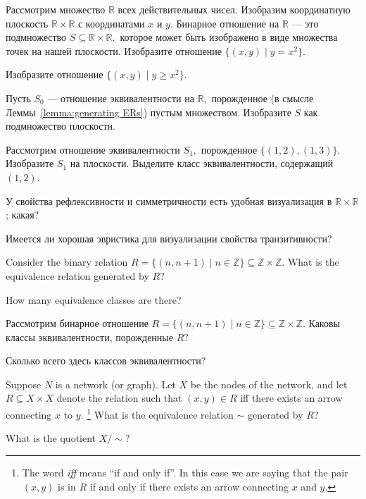 \documentclass[../main/CT4S-EN-RU]{subfiles}
\begin{document}
\begin{exerciseRUS}
Рассмотрим множество ${ℝ}$ всех действительных чисел. Изобразим координатную плоскость ${ℝ}\times{ℝ}$ с координатами $x$ и $y.$ Бинарное отношение на ${ℝ}$ — это подмножество $S\subseteq{ℝ}\times{ℝ},$ которое может быть изображено в виде множества точек на нашей плоскости. 
\sexc Изобразите отношение $\{(x,y){\;|\;}y=x^2\}.$ 
\item Изобразите отношение $\{(x,y){\;|\;}y\geq x^2\}.$
\item Пусть $S_0$ — отношение эквивалентности на ${ℝ},$ порожденное (в смысле Леммы~\ref{lemma:generating ERs}) пустым множеством. Изобразите $S$ как подмножество плоскости.
\item Рассмотрим отношение эквивалентности $S_1,$ порожденное $\{(1,2),(1,3)\}.$ Изобразите $S_1$ на плоскости. Выделите класс эквивалентности, содержащий $(1,2).$
\item У свойства рефлексивности и симметричности есть удобная визуализация в ${ℝ}\times{ℝ}$; какая? 
\item Имеется ли хорошая эвристика для визуализации свойства транзитивности?
\endsexc
\end{exerciseRUS}

\begin{exerciseENG}
Consider the binary relation $R=\{(n,n+1){\;|\;}n\in{ℤ}\}\subseteq{ℤ}\times{ℤ}.$ 
\sexc What is the equivalence relation generated by $R?$ 
\item How many equivalence classes are there?
\endsexc
\end{exerciseENG}

\begin{exerciseRUS}
Рассмотрим бинарное отношение $R=\{(n,n+1){\;|\;}n\in{ℤ}\}\subseteq{ℤ}\times{ℤ}.$ 
\sexc Каковы классы эквивалентности, порожденные $R?$ 
\item Сколько всего здесь классов эквивалентности?
\endsexc
\end{exerciseRUS}

\begin{exerciseENG}
Suppose $N$ is a network (or graph). Let $X$ be the nodes of the network, and let $R\subseteq X\times X$ denote the relation such that $(x,y)\in R$ iff there exists an arrow connecting $x$ to $y.$%
\footnote{The word {\em iff} means “if and only if”. In this case we are saying that the pair $(x,y)$ is in $R$ if and only if there exists an arrow connecting $x$ and $y.$}
\sexc What is the equivalence relation $\sim$ generated by $R?$ 
\item What is the quotient $X/\sim?$
\endsexc
\end{exerciseENG}
\end{document}
